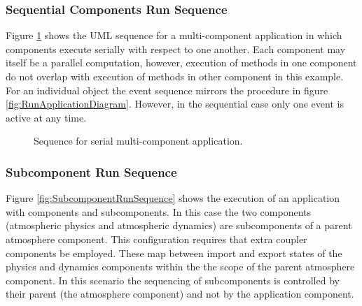 \subsubsection{Sequential Components Run Sequence}

Figure \ref{fig:SequentialComponentsRunSequence} shows the UML sequence
for a multi-component application in which components execute serially
with respect to one another. Each component may itself be a parallel
computation, however, execution of methods in one component do not overlap 
with execution of methods in other component in this example.
For an individual object the event sequence mirrors the procedure in 
figure \ref{fig:RunApplicationDiagram}. However, in the sequential
case only one event is active at any time.
\begin{figure}
\caption[{Sequential Component Run}]{Sequence for serial multi-component
application.\\}
\begin{center}
\label{fig:SequentialComponentsRunSequence}
\end{center}
\end{figure}

\subsubsection{Subcomponent Run Sequence}
Figure \ref{fig:SubcomponentRunSequence} shows the execution of an
application with components and subcomponents. In this case the 
two components (atmospheric physics and atmospheric dynamics) are 
subcomponents
of a parent atmosphere component. This configuration requires that extra 
coupler components be employed. These map between import and export states of 
the physics and dynamics components within the the scope of the
parent atmosphere component. In this scenario the sequencing of
subcomponents is controlled by their parent (the atmosphere component)
and not by the application component.

